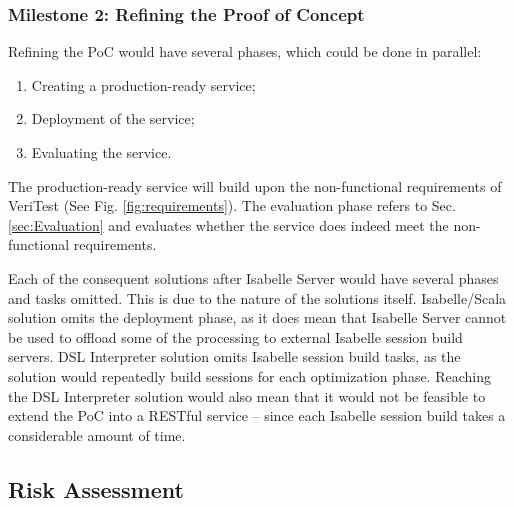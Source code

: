 \subsubsection{Milestone 2: Refining the Proof of Concept}

Refining the PoC would have several phases, which could be done in parallel:
\begin{enumerate}
    \item Creating a production-ready service;
    \item Deployment of the service;
    \item Evaluating the service.
\end{enumerate}

The production-ready service will build upon the non-functional requirements of VeriTest (See Fig. \ref{fig:requirements}). 
The evaluation phase refers to Sec. \ref{sec:Evaluation} and evaluates whether the service does indeed meet the 
non-functional requirements.

Each of the consequent solutions after Isabelle Server would have several phases and tasks omitted. This is due to the nature 
of the solutions itself. Isabelle/Scala solution omits the deployment phase, as it does mean that Isabelle Server cannot be 
used to offload some of the processing to external Isabelle session build servers. DSL Interpreter solution omits 
Isabelle session build tasks, as the solution would repeatedly build sessions for each optimization phase. Reaching the 
DSL Interpreter solution would also mean that it would not be feasible to extend the PoC into a RESTful service -- since 
each Isabelle session build takes a considerable amount of time.

\pagebreak

\subsection{Risk Assessment}


